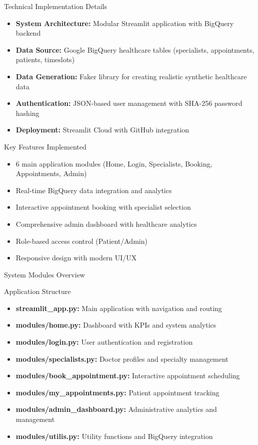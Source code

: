 \documentclass[aspectratio=169]{beamer}
\begin{document}
\begin{frame}{Technical Implementation Details}
\begin{itemize}
    \item \textbf{System Architecture:} Modular Streamlit application with BigQuery backend
    \item \textbf{Data Source:} Google BigQuery healthcare tables (specialists, appointments, patients, timeslots)
    \item \textbf{Data Generation:} Faker library for creating realistic synthetic healthcare data
    \item \textbf{Authentication:} JSON-based user management with SHA-256 password hashing
    \item \textbf{Deployment:} Streamlit Cloud with GitHub integration
\end{itemize}

\vspace{1cm}

\begin{block}{Key Features Implemented}
\begin{itemize}
    \item 6 main application modules (Home, Login, Specialists, Booking, Appointments, Admin)
    \item Real-time BigQuery data integration and analytics
    \item Interactive appointment booking with specialist selection
    \item Comprehensive admin dashboard with healthcare analytics
    \item Role-based access control (Patient/Admin)
    \item Responsive design with modern UI/UX
\end{itemize}
\end{block}
\end{frame}

\begin{frame}{System Modules Overview}
\begin{block}{Application Structure}
\begin{itemize}
    \item \textbf{streamlit\_app.py:} Main application with navigation and routing
    \item \textbf{modules/home.py:} Dashboard with KPIs and system analytics
    \item \textbf{modules/login.py:} User authentication and registration
    \item \textbf{modules/specialists.py:} Doctor profiles and specialty management
    \item \textbf{modules/book\_appointment.py:} Interactive appointment scheduling
    \item \textbf{modules/my\_appointments.py:} Patient appointment tracking
    \item \textbf{modules/admin\_dashboard.py:} Administrative analytics and management
    \item \textbf{modules/utilis.py:} Utility functions and BigQuery integration
\end{itemize}
\end{block}
\end{frame}
\end{document}
